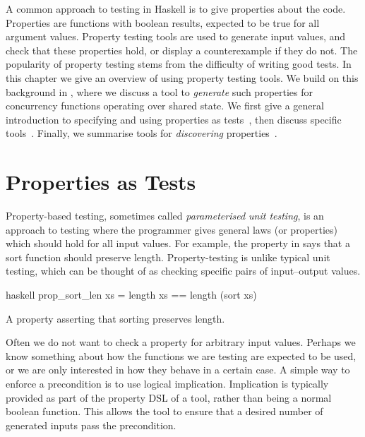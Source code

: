 A common approach to testing in Haskell is to give properties about
the code.  Properties are functions with boolean results, expected to
be true for all argument values.  Property testing tools are used to
generate input values, and check that these properties hold, or
display a counterexample if they do not.  The popularity of property
testing stems from the difficulty of writing good tests.  In this
chapter we give an overview of using property testing tools.  We build
on this background in , where we discuss a tool to
\emph{generate} such properties for concurrency functions operating
over shared state.  We first give a general introduction to specifying
and using properties as tests~, then
discuss specific tools~.  Finally, we
summarise tools for \emph{discovering}
properties~.

\section{Properties as Tests}
\label{sec:property_testing-intro}

Property-based testing\cite{claessen2000}, sometimes called
\emph{parameterised unit testing}, is an approach to testing where the
programmer gives general laws (or properties) which should hold for
all input values.  For example, the property in
 says that a sort function should preserve
length.  Property-testing is unlike typical unit testing, which can be
thought of as checking specific pairs of input--output values.

\begin{listing}
\centering
\begin{cminted}{haskell}
prop_sort_len xs = length xs == length (sort xs)
\end{cminted}
\caption{A property asserting that sorting preserves length.}\label{lst:prop_sort_len}
\end{listing}

Often we do not want to check a property for arbitrary input values.
Perhaps we know something about how the functions we are testing are
expected to be used, or we are only interested in how they behave in a
certain case.  A simple way to enforce a precondition is to use
logical implication.  Implication is typically provided as part of the
property DSL of a tool, rather than being a normal boolean function.
This allows the tool to ensure that a desired number of generated
inputs pass the precondition.

